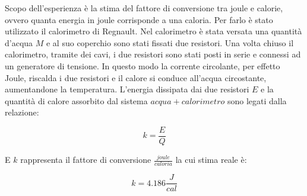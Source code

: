 Scopo dell'esperienza è la stima del fattore di conversione tra joule e calorie, ovvero quanta energia in joule corrisponde a una caloria. Per farlo è stato utilizzato il calorimetro di Regnault. Nel calorimetro è stata versata una quantità d'acqua $M$ e al suo coperchio sono stati fissati due resistori. Una volta chiuso il calorimetro, tramite dei cavi, i due resistori sono stati posti in serie e connessi ad un generatore di tensione. In questo modo la corrente circolante, per effetto Joule, riscalda i due resistori e il calore si conduce all'acqua circostante, aumentandone la temperatura. L'energia dissipata dai due resistori $E$ e la quantità di calore assorbito dal sistema $acqua+calorimetro$ sono legati dalla relazione:

\begin{equation}
	k = \frac{E}{Q}
\end{equation}

E $k$ rappresenta il fattore di conversione $\frac{joule}{caloria}$ la cui stima reale è:

\begin{equation}
	k = 4.186 \frac{J}{cal}
\end{equation}

